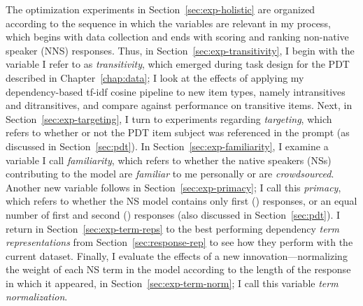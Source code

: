 The optimization experiments in Section~\ref{sec:exp-holistic} are organized according to the sequence in which the variables are relevant in my process, which begins with data collection and ends with scoring and ranking non-native speaker (NNS) responses. Thus, in Section~\ref{sec:exp-transitivity}, I begin with the variable I refer to as \textit{transitivity}, which emerged during task design for the PDT described in Chapter~\ref{chap:data}; I look at the effects of applying my dependency-based tf-idf cosine pipeline to new item types, namely intransitives and ditransitives, and compare against performance on transitive items. Next, in Section~\ref{sec:exp-targeting}, I turn to experiments regarding \textit{targeting}, which refers to whether or not the PDT item subject was referenced in the prompt (as discussed in Section~\ref{sec:pdt}). In Section~\ref{sec:exp-familiarity}, I examine a variable I call \textit{familiarity}, which refers to whether the native speakers (NSs) contributing to the model are \textit{familiar} to me personally or are \textit{crowdsourced}. Another new variable follows in Section~\ref{sec:exp-primacy}; I call this \textit{primacy}, which refers to whether the NS model contains only first () responses, or an equal number of first and second () responses (also discussed in Section~\ref{sec:pdt}). I return in Section~\ref{sec:exp-term-reps} to the best performing dependency \textit{term representations} from Section~\ref{sec:response-rep} to see how they perform with the current dataset. Finally, I evaluate the effects of a new innovation---normalizing the weight of each NS term in the model according to the length of the response in which it appeared, in Section~\ref{sec:exp-term-norm}; I call this variable \textit{term normalization}.




